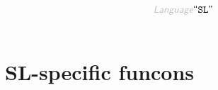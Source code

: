 \begin{displaymath}
\KEY{Language} \STRING{SL}
\end{displaymath}

\begin{align*}
  [ ~ 
  \KEY{Funcon} ~ & \NAMEREF{sl-to-string} \\
  \KEY{Funcon} ~ & \NAMEREF{integer-add-else-string-append} \\
  \KEY{Funcon} ~ & \NAMEREF{int} \\
  \KEY{Funcon} ~ & \NAMEREF{bool} \\
  \KEY{Funcon} ~ & \NAMEREF{str} \\
  \KEY{Funcon} ~ & \NAMEREF{obj} \\
  \KEY{Funcon} ~ & \NAMEREF{fun} \\
  \KEY{Funcon} ~ & \NAMEREF{scope-closed} \\
  \KEY{Funcon} ~ & \NAMEREF{initialise-local-variables} \\
  \KEY{Funcon} ~ & \NAMEREF{local-variable} \\
  \KEY{Funcon} ~ & \NAMEREF{local-variable-initialise} \\
  \KEY{Funcon} ~ & \NAMEREF{local-variable-assign} \\
  \KEY{Funcon} ~ & \NAMEREF{initialise-global-bindings} \\
  \KEY{Funcon} ~ & \NAMEREF{override-global-bindings} \\
  \KEY{Funcon} ~ & \NAMEREF{global-bound} \\
  \KEY{Funcon} ~ & \NAMEREF{read-line} \\
  \KEY{Funcon} ~ & \NAMEREF{print-line}
  ~ ]
\end{align*}
\section*{SL-specific funcons}\hypertarget{sl-specific-funcons}{}\label{sl-specific-funcons}

